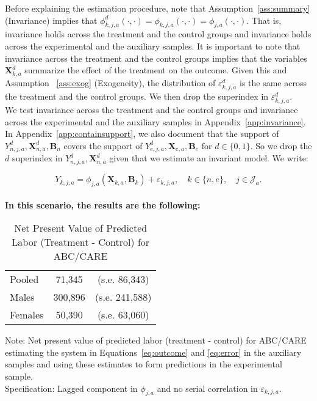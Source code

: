 \noindent Before explaining the estimation procedure, note that Assumption~\ref{ass:summary} (Invariance) implies that $\phi_{k,j,a}^d \left (\cdot, \cdot \right) = \phi_{k,j,a}  \left (\cdot, \cdot \right) = \phi_{j,a}  \left (\cdot, \cdot \right)$. That is, invariance holds across the treatment and the control groups and invariance holds across the experimental and the auxiliary samples. It is important to note that invariance across the treatment and the control groups implies that the variables $\bm{X}_{k,a}^d$ summarize the effect of the treatment on the outcome. Given this and Assumption ~\ref{ass:exog} (Exogeneity), the distribution of $\varepsilon_{k,j,a}^d$ is the same across the treatment and the control groups. We then drop the superindex in $\varepsilon_{k,j,a}^d$.\\ 

\noindent We test invariance across the treatment and the control groups and invariance across the experimental and the auxiliary samples  in Appendix~\ref{app:invariance}.\\

\noindent In Appendix~\ref{app:containsupport}, we also document that the support of $Y_{n,j,a}^d, \bm{X}_{n,a}^d, \bm{B}_{n}$ covers the support of $Y_{e,j,a}^d, \bm{X}_{e,a}, \bm{B}_{e}$ for $d \in \{0, 1\}$. So we drop the $d$ superindex in $Y_{n,j,a}^d, \bm{X}_{n,a}^d$ given that we estimate an invariant model. We write:

\begin{equation}\label{eq:routcome}
Y_{k,j,a} = \phi_{j,a} (\bm{X}_{k,a}, \bm{B}_k) + \varepsilon_{k,j,a}, \quad k \in \{n,e\}, \quad j \in \mathcal{J}_a.
\end{equation}\\

\noindent \textbf{In this scenario, the results are the following:}\\

\begin{table}[H] 
\begin{threeparttable}
\caption{Net Present Value of Predicted Labor (Treatment - Control) for ABC/CARE}
\label{table:yourlabel}
\centering 
\begin{tabular}{lcc} \toprule
Pooled & 71,345 & (s.e. 86,343) \\
Males & 300,896 & (s.e. 241,588) \\ 
Females & 50,390 & (s.e. 63,060) \\ \bottomrule
\end{tabular}
\end{threeparttable}
\end{table}
\begin{spacing}{1}
\begin{footnotesize}
\noindent Note: Net present value of predicted labor (treatment - control) for ABC/CARE estimating the system in Equations~\eqref{eq:outcome} and \eqref{eq:error} in the auxiliary samples and using these estimates to form predictions in the experimental sample.\\ 
\noindent Specification: Lagged component in $\phi_{j,a}$ and no serial correlation in $\varepsilon_{k,j,a}$. 
\end{footnotesize}
\end{spacing}



